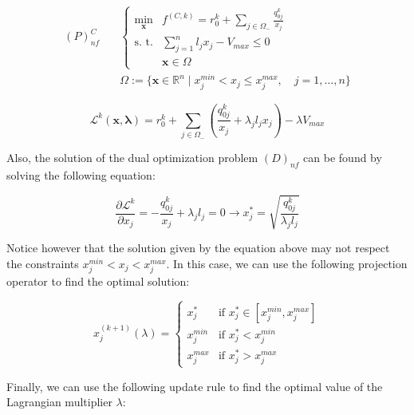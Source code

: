 \begin{equation}
    \begin{aligned}
        (P)_{nf}^C \quad & \begin{cases}
                               \min_{\bm{x}} & f^{(C, k)} = r_0^k + \sum_{j \in \Omega_-} \frac{q_{0j}^k}{x_j} \\
                               \text{s. t.}  & \sum_{j=1}^{n} l_j x_j - V_{max} \leq 0                         \\
                                             & \bm{x} \in \Omega
                           \end{cases} \\
                         & \Omega := \{ \bm{x} \in \mathbb{R}^n \mid x_j^{min} < x_j \le x_j^{max}, \quad j = 1, \dots, n \}
    \end{aligned}
\end{equation}

\begin{equation}
    \mathcal{L}^{k}(\bm{x}, \bm{\lambda}) = r_0^k + \sum_{j \in \Omega_-} (\frac{q_{0j}^k}{x_j} + \lambda_j l_j x_j) - \lambda V_{max}
\end{equation}

Also, the solution of the dual optimization problem $(D)_{nf}$ can be found by solving the following equation:

\begin{equation}
    \frac{\partial \mathcal{L}^k}{\partial x_j} = - \frac{q_{0j}^k}{x_j} + \lambda_j l_j = 0 \rightarrow x_j^* = \sqrt{\frac{q_{0j}^k}{\lambda_j l_j}}
\end{equation}

Notice however that the solution given by the equation above may not respect the constraints $x_j^{min} < x_j < x_j^{max}$.
In this case, we can use the following projection operator to find the optimal solution:

\begin{equation}
    x_j^{(k+1)}(\lambda) = \begin{cases}
        x_j^*     & \text{if } x_j^* \in [x_j^{min}, x_j^{max}] \\
        x_j^{min} & \text{if } x_j^* < x_j^{min}                \\
        x_j^{max} & \text{if } x_j^* > x_j^{max}
    \end{cases}
\end{equation}

Finally, we can use the following update rule to find the optimal value of the Lagrangian multiplier $\lambda$:

